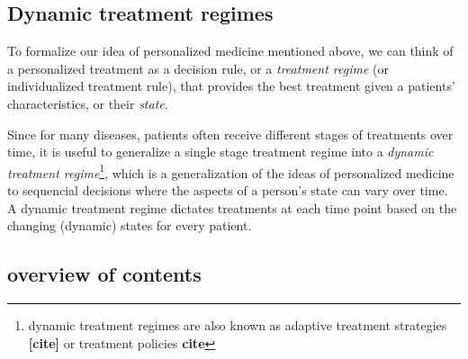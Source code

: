 \documentclass[12pt]{article}
\begin{document}


%
%
%




\subsection{Dynamic treatment regimes} %
\label{sub:dynamic_treatment_regimes}

To formalize our idea of personalized medicine mentioned above, we can think of a personalized treatment as a decision rule, or a \emph{treatment regime} (or individualized treatment rule), that provides the best treatment given a patients' characteristics, or their \emph{state}.

Since for many diseases, patients often receive different stages of treatments over time, it is useful to generalize a single stage treatment regime into
a \emph{dynamic treatment regime}\footnote{ dynamic treatment regimes are also known as adaptive treatment strategies \textbf{[cite]} or treatment policies \textbf{cite}}, which is a generalization of the ideas of personalized medicine to sequencial decisions where the aspects of a person's state can vary over time. A dynamic treatment regime dictates treatments at each time point based on the changing (dynamic) states for every patient.





\subsection{overview of contents} %
\label{sub:overview_of_contents}

\end{document}
